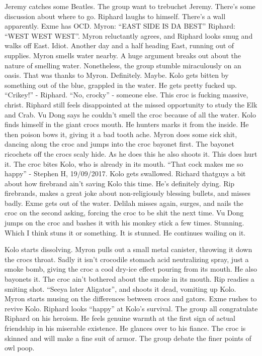 Jeremy catches some Beatles. The group want to trebuchet Jeremy. There’s some discussion about where to go. Riphard laughs to himself. There’s a wall apparently. Exme has OCD. Myron: “EAST SIDE IS DA BEST” Riphard: “WEST WEST WEST”. Myron reluctantly agrees, and Riphard looks smug and walks off East. Idiot. Another day and a half heading East, running out of supplies. Myron smells water nearby. A huge argument breaks out about the nature of smelling water. Nonetheless, the group stumble miraculously on an oasis. That was thanks to Myron. Definitely. Maybe. Kolo gets bitten by something out of the blue, grappled in the water. He gets pretty fucked up. “Crikey!” - Riphard.  “No, crocky” - someone else. This croc is fucking massive, christ. Riphard still feels disappointed at the missed opportunity to study the Elk and Crab. Vu Dong says he couldn’t smell the croc because of all the water. Kolo finds himself in the giant crocs mouth. He hunters marks it from the inside. He then poison bows it, giving it a bad tooth ache. Myron does some sick shit, dancing along the croc and jumps into the croc bayonet first. The bayonet ricochets off the crocs scaly hide. As he does this he also shoots it. This does hurt it. The croc bites Kolo, who is already in its mouth. “That cock makes me so happy” - Stephen H, 19/09/2017. Kolo gets swallowed. Richard thatguys a bit about how firebrand ain’t saving Kolo this time. He’s definitely dying. Rip firebrands, makes a great joke about non-religiously blessing bullets, and misses badly. Exme gets out of the water. Delilah misses again, surges, and nails the croc on the second asking, forcing the croc to be shit the next time. Vu Dong jumps on the croc and bashes it with his monkey stick a few times. Stunning. Which I think stuns it or something. It is stunned. He continues wailing on it.\medskip

Kolo starts dissolving. Myron pulls out a small metal canister, throwing it down the crocs throat. Sadly it isn’t crocodile stomach acid neutralizing spray, just a smoke bomb, giving the croc a cool dry-ice effect pouring from its mouth. He also bayonets it. The croc ain’t bothered about the smoke in its mouth. Rip readies a smiting shot. “Seeya later Aligator”, and shoots it dead, vomiting up Kolo. Myron starts musing on the differences between crocs and gators. Exme rushes to revive Kolo. Riphard looks “happy” at Kolo’s survival. The group all congratulate Riphard on his heroism. He feels genuine warmth at the first sign of actual friendship in his miserable existence. He glances over to his fiance. The croc is skinned and will make a fine suit of armor. The group debate the finer points of owl poop. \medskip

